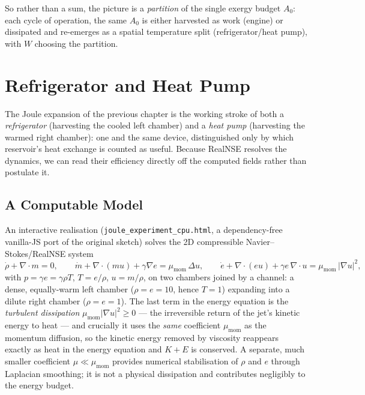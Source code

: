 So rather than a sum, the picture is a \emph{partition} of the single exergy
budget $A_0$: each cycle of operation, the same $A_0$ is either harvested as
work (engine) or dissipated and re-emerges as a spatial temperature split
(refrigerator/heat pump), with $W$ choosing the partition.

\iffalse  %
\chapter{Refrigerator and Heat Pump}\label{ch:refrig}

The Joule expansion of the previous chapter is the working stroke of both a
\emph{refrigerator} (harvesting the cooled left chamber) and a \emph{heat pump}
(harvesting the warmed right chamber): one and the same device, distinguished
only by which reservoir's heat exchange is counted as useful. Because RealNSE
resolves the dynamics, we can read their efficiency directly off the computed
fields rather than postulate it.

\section{A Computable Model}

An interactive realisation (\texttt{joule\_experiment\_cpu.html}, a
dependency-free vanilla-JS port of the original sketch) solves the 2D
compressible Navier--Stokes/RealNSE system
\[
\dot\rho+\nabla\cdot m=0,\qquad
\dot m+\nabla\cdot(mu)+\gamma\nabla e=\mu_{\mathrm{mom}}\,\Delta u,\qquad
\dot e+\nabla\cdot(eu)+\gamma e\,\nabla\cdot u=\mu_{\mathrm{mom}}\,|\nabla u|^2,
\]
with $p=\gamma e=\gamma\rho T$, $T=e/\rho$, $u=m/\rho$, on two chambers joined by a
channel: a dense, equally-warm left chamber ($\rho=e=10$, hence $T=1$) expanding
into a dilute right chamber ($\rho=e=1$). The last term in the energy equation is
the \emph{turbulent dissipation} $\mu_{\mathrm{mom}}|\nabla u|^2\ge 0$ --- the
irreversible return of the jet's kinetic energy to heat --- and crucially it uses
the \emph{same} coefficient $\mu_{\mathrm{mom}}$ as the momentum diffusion, so the
kinetic energy removed by viscosity reappears exactly as heat in the energy
equation and $K+E$ is conserved. A separate, much smaller coefficient
$\mu\ll\mu_{\mathrm{mom}}$ provides numerical stabilisation of $\rho$ and $e$
through Laplacian smoothing; it is not a physical dissipation and contributes
negligibly to the energy budget.

